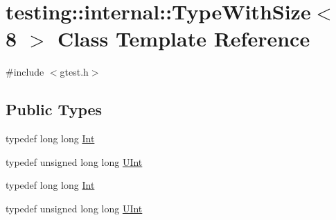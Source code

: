 \hypertarget{classtesting_1_1internal_1_1_type_with_size_3_018_01_4}{\section{testing\-:\-:internal\-:\-:Type\-With\-Size$<$ 8 $>$ Class Template Reference}
\label{classtesting_1_1internal_1_1_type_with_size_3_018_01_4}
}


{\ttfamily \#include $<$gtest.\-h$>$}

\subsection*{Public Types}
\begin{DoxyCompactItemize}
\item 
typedef long long \hyperlink{classtesting_1_1internal_1_1_type_with_size_3_018_01_4_a36d5697e5f5254b0495f13c97d747e36}{Int}
\item 
typedef unsigned long long \hyperlink{classtesting_1_1internal_1_1_type_with_size_3_018_01_4_a747e21c5aee8faf07ec65cd4c3d1ca62}{U\-Int}
\item 
typedef long long \hyperlink{classtesting_1_1internal_1_1_type_with_size_3_018_01_4_a36d5697e5f5254b0495f13c97d747e36}{Int}
\item 
typedef unsigned long long \hyperlink{classtesting_1_1internal_1_1_type_with_size_3_018_01_4_a747e21c5aee8faf07ec65cd4c3d1ca62}{U\-Int}
\end{DoxyCompactItemize}


